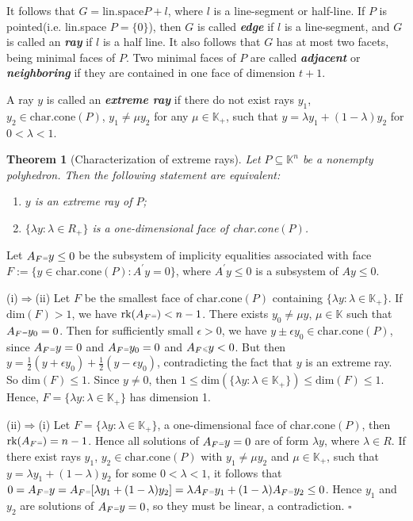 \documentclass{article}
\newcounter{lecnum}
\newcommand{\tleq}{{\mbox{\tiny $\leqslant$}}}
\newcommand{\teq}{{\mbox{\tiny $=$}}}
\newtheorem{theorem}{Theorem}[lecnum]
\newenvironment{proof}{{\it Proof.}}{ \hfill $\square$}
\def\K{{\mathbb K}}
\begin{document}
It follows that $G=\mbox{lin.space} P +l$, where $l$ is a line-segment or half-line. If $P$ is pointed(i.e. lin.space $P=\{0\}$), then $G$ is called \emph{\textbf{edge}} if $l$ is a line-segment, and $G$ is called an \emph{\textbf{ray}} if $l$ is a half line. It also follows that $G$ has at most two facets, being minimal faces of $P$. Two minimal faces of $P$ are called \emph{\textbf{adjacent}} or \emph{\textbf{neighboring}} if they are contained in one face of dimension $t+1$.

A ray $y$ is called an \emph{\textbf{extreme ray}} if there do not exist rays $y_1$, $y_2\in\mbox{char.cone}(P)$, $y_1\not=\mu y_2$ for any $\mu\in\K_+$, such that $y=\lambda y_1+(1-\lambda)y_2$ for $0<\lambda<1$.

\begin{theorem}[Characterization of extreme rays] \hfill
Let $P\subseteq \K^n$ be a nonempty polyhedron. Then the following statement are equivalent:
\begin{enumerate}
  \item[\emph{(i)}] $y$ is an extreme ray of $P$;
  \item[\emph{(ii)}] $\{\lambda y: \lambda\in R_+\}$ is a one-dimensional face of char.cone$(P)$.
\end{enumerate}
\end{theorem}
\begin{proof}
Let $A_{F}\teq y\leq 0$ be the subsystem of implicity equalities associated with face $F:=\{y\in\mbox{char.cone}(P):A^\prime y=0\}$, where $A^\prime y\leq 0$ is a subsystem of $Ay\leq 0$.

 (i)$\Rightarrow$(ii)  Let $F$ be the smallest face of $\mbox{char.cone}(P)$ containing $\{\lambda y:\lambda\in\K_+\}$. If $\mbox{dim}(F)>1$, we have $\mbox{rk}(A_F\teq)<n-1$. There exists $y_0\not=\mu y$, $\mu\in\K$ such that $A_F\teq y_0=0$. Then for sufficiently small $\epsilon>0$, we have $y\pm \epsilon y_0\in \mbox{char.cone}(P)$, since $A_F\teq y=0$ and $A_F\teq y_0=0$ and $A_F\tleq y<0$. But then $y=\frac{1}{2}(y+\epsilon y_0)+\frac{1}{2}(y-\epsilon y_0)$, contradicting the fact that $y$ is an extreme ray. So $\mbox{dim}(F)\leq 1$. Since $y\not=0$, then $1\leq \mbox{dim}(\{\lambda y: \lambda\in\K_+\})\leq \mbox{dim}(F)\leq 1$. Hence, $F=\{\lambda y: \lambda\in\K_+\}$ has dimension 1.

(ii)$\Rightarrow$(i) Let $F=\{\lambda y:\lambda\in\K_+\}$, a one-dimensional face of char.cone$(P)$, then $\mbox{rk}(A_F\teq)=n-1$. Hence all solutions of $A_F\teq y=0$ are of form $\lambda y$, where $\lambda\in R$. If there exist rays $y_1$, $y_2\in\mbox{char.cone}(P)$ with $y_1\not=\mu y_2$ and $\mu\in\K_+$, such that $y=\lambda y_1+(1-\lambda)y_2$ for some $0<\lambda<1$, it follows that $0=A_F\teq y=A_F\teq[\lambda y_1+(1-\lambda)y_2]=\lambda A_F\teq y_1+(1-\lambda)A_F\teq y_2\leq 0$. Hence $y_1$ and $y_2$ are solutions of $A_F\teq y=0$, so they must be linear, a contradiction.
\end{proof}
\end{document}
